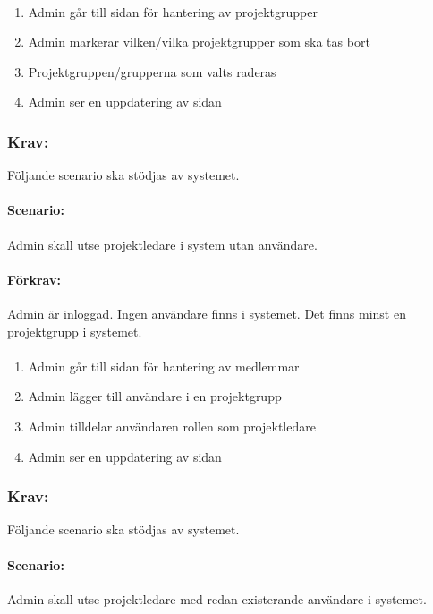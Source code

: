 \documentclass[paper=a4, fontsize=11pt,twoside]{article}
\begin{document}
	\paragraph{}
	\begin{enumerate}
		\item Admin går till sidan för hantering av projektgrupper
		\item Admin markerar vilken/vilka projektgrupper som ska tas bort
		\item Projektgruppen/grupperna som valts raderas
		\item Admin ser en uppdatering av sidan
	\end{enumerate}
	
	\subsubsection{Krav:} Följande scenario ska stödjas av systemet. 
	\paragraph{Scenario:}
	Admin skall utse projektledare i system utan användare.
	\paragraph{Förkrav:}
	Admin är inloggad. Ingen användare finns i systemet. Det finns minst en projektgrupp i systemet.
	\paragraph{}
	\begin{enumerate}
		\item Admin går till sidan för hantering av medlemmar
		\item Admin lägger till användare i en projektgrupp
		\item Admin tilldelar användaren rollen som projektledare
		\item Admin ser en uppdatering av sidan
	\end{enumerate}
	
	\subsubsection{Krav:} Följande scenario ska stödjas av systemet. 
	\paragraph{Scenario:}
	Admin skall utse projektledare med redan existerande användare i systemet.
\end{document}
